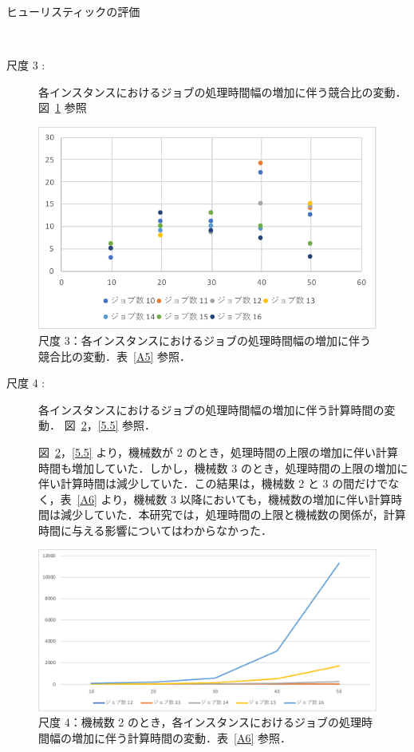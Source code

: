 \documentclass[12pt]{optlab-bachelor}
\begin{document}
\begin{description}
  \item[ヒューリスティックの評価] ~
\end{description}
\begin{description}
  \item[尺度 3 :] 各インスタンスにおけるジョブの処理時間幅の増加に伴う競合比の変動．
  図~\ref{5.3} 参照
\end{description}

\begin{figure}[h]
  \centering
  \includegraphics[width = 14cm]{figure/compId1.pdf}
  \caption{尺度 3：各インスタンスにおけるジョブの処理時間幅の増加に伴う競合比の変動．表~\ref{A5} 参照．}
  \label{5.3}
\end{figure}

\begin{description}
  \item[尺度 4 :] 各インスタンスにおけるジョブの処理時間幅の増加に伴う計算時間の変動．
  図~\ref{5.4}，\ref{5.5} 参照．

  図~\ref{5.4}，\ref{5.5} より，機械数が 2 のとき，処理時間の上限の増加に伴い計算時間も増加していた．しかし，機械数 3 のとき，処理時間の上限の増加に伴い計算時間は減少していた．この結果は，機械数 2 と 3 の間だけでなく，表~\ref{A6} より，機械数 3 以降においても，機械数の増加に伴い計算時間は減少していた．本研究では，処理時間の上限と機械数の関係が，計算時間に与える影響についてはわからなかった．
\end{description}

\begin{figure}[h]
  \centering
  \includegraphics[width = 16cm]{figure/ptTimeId1.pdf}
  \caption{尺度 4：機械数 2 のとき，各インスタンスにおけるジョブの処理時間幅の増加に伴う計算時間の変動．表~\ref{A6} 参照．}
  \label{5.4}
\end{figure}
\end{document}
